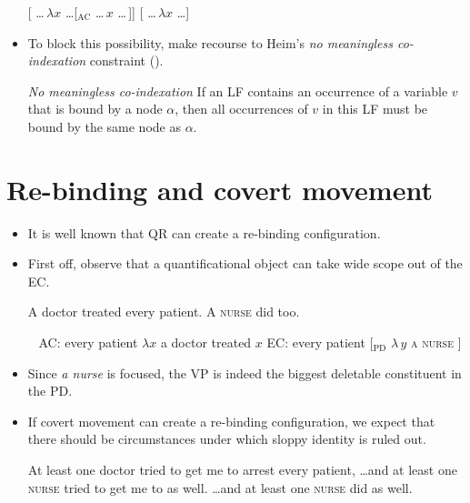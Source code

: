 \documentclass[nofonts,nobib]{tufte-handout}
\begin{document}
\begin{itemize}
    \pex
    \a\label{circ}[ \ldots\,\(λ x\) \ldots [\(_{\text{AC}}\) \ldots\,\(x\) \ldots\,]]
    \a\label{circ2}[ \ldots\,\(λ x\) \ldots {}]
    \xe
    
  \item To block this possibility, \citeauthor{fox_maxelide_2005} make recourse to Heim's \emph{no meaningless co-indexation} constraint (\citealt{heim1997}).
    
\ex
    \label{meaningless}\emph{No meaningless co-indexation}\newline
    If an LF contains an occurrence of a variable \(v\) that is bound by a node \(α\), then all occurrences of \(v\) in this LF must be bound by the same node as \(α\).
\xe

    
\end{itemize}
    
\section{Re-binding and covert movement}
    
\begin{itemize}

  \item It is well known that QR can create a re-binding configuration.
    
  \item First off, observe that a quantificational object can take wide scope out of the EC.

    \ex
    \label{qr}A doctor treated every patient.\newline
    A \textsc{nurse} did  too.
    \xe
    
    \pex~\label{qr2}
    \a\label{qr2a} AC: every patient \( λ x \) a doctor treated \(x\)
    \a\label{qr2b} EC: every patient [\(_{\text{PD}}\) \(λ\,y\) \textsc{a nurse} ]
    \xe
    
  \item Since \emph{a nurse} is focused, the VP is indeed the biggest deletable constituent in the PD.
    
  \item If covert movement can create a re-binding configuration, we expect that there should be circumstances under which sloppy identity is ruled out. 
    
    \pex
    At least one doctor tried to get me to arrest every patient,
    \a \ldots and at least one \textsc{nurse} tried to get me to  as well.
    \a \ldots and at least one \textsc{nurse} did  as well.
    \xe
    
\end{itemize}
    
\end{document}
